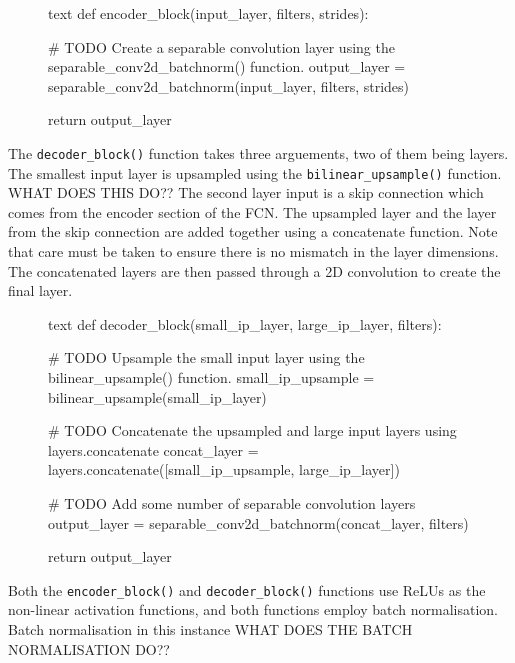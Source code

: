\documentclass[a4paper]{article}
\begin{document}
\begin{figure}[h]\scriptsize
\begin{sexylisting}{text}
def encoder_block(input_layer, filters, strides):
    
    # TODO Create a separable convolution layer using the separable_conv2d_batchnorm() function.
    output_layer = separable_conv2d_batchnorm(input_layer, filters, strides)
    
    return output_layer
\end{sexylisting}
\end{figure}

The \verb|decoder_block()| function takes three arguements, two of them being layers. The smallest input layer is upsampled using the \verb|bilinear_upsample()| function. WHAT DOES THIS DO?? The second layer input is a skip connection which comes from the encoder section of the FCN. The upsampled layer and the layer from the skip connection are added together using a concatenate function. Note that care must be taken to ensure there is no mismatch in the layer dimensions. The concatenated layers are then passed through a 2D convolution to create the final layer.  

\begin{figure}[h]\scriptsize
\begin{sexylisting}{text}
def decoder_block(small_ip_layer, large_ip_layer, filters):
    
    # TODO Upsample the small input layer using the bilinear_upsample() function.
    small_ip_upsample = bilinear_upsample(small_ip_layer)
    
    # TODO Concatenate the upsampled and large input layers using layers.concatenate
    concat_layer = layers.concatenate([small_ip_upsample, large_ip_layer])
    
    # TODO Add some number of separable convolution layers
    output_layer = separable_conv2d_batchnorm(concat_layer, filters)
    
    return output_layer
\end{sexylisting}
\end{figure}

Both the \verb|encoder_block()| and \verb|decoder_block()| functions use ReLUs as the non-linear activation functions, and both functions employ batch normalisation. Batch normalisation in this instance WHAT DOES THE BATCH NORMALISATION DO??

\clearpage
\end{document}
